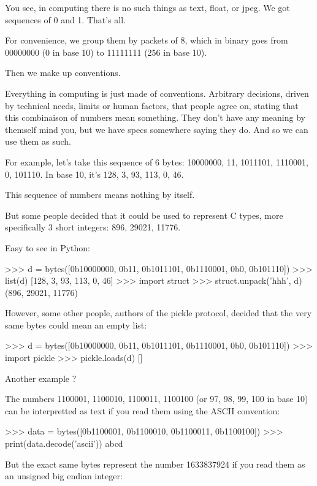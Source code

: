 You see, in computing there is no such things as text, float, or jpeg. We got sequences of 0 and 1. That's all.

For convenience, we group them by packets of 8, which in binary goes from 00000000 (0 in base 10) to 11111111 (256 in base 10).

Then we make up conventions.

Everything in computing is just made of conventions. Arbitrary decisions, driven by technical needs, limits or human factors, that people agree on, stating that this combinaison of numbers mean something. They don't have any meaning by themself mind you, but we have specs somewhere saying they do. And so we can use them as such.

For example, let's take this sequence of 6 bytes: 10000000, 11, 1011101, 1110001, 0, 101110. In base 10, it's 128, 3, 93, 113, 0, 46.

This sequence of numbers means nothing by itself.

But some people decided that it could be used to represent C types, more specifically 3 short integers: 896, 29021, 11776.

Easy to see in Python:

\begin{py2and3}
>>> d = bytes([0b10000000, 0b11, 0b1011101, 0b1110001, 0b0, 0b101110])
>>> list(d)
[128, 3, 93, 113, 0, 46]
>>> import struct
>>> struct.unpack('hhh', d)
(896, 29021, 11776)
\end{py2and3}

However, some other people, authors of the pickle protocol, decided that the very same bytes could mean an empty list:

\begin{py2and3}
>>> d = bytes([0b10000000, 0b11, 0b1011101, 0b1110001, 0b0, 0b101110])
>>> import pickle
>>> pickle.loads(d)
[]
\end{py2and3}

Another example ?

The numbers 1100001, 1100010, 1100011, 1100100 (or 97, 98, 99, 100 in base 10) can be interpretted as text if you read them using the ASCII convention:

\begin{py2and3}
>>> data = bytes([0b1100001, 0b1100010, 0b1100011, 0b1100100])
>>> print(data.decode('ascii'))
abcd
\end{py2and3}

But the exact same bytes represent the number 1633837924 if you read them as an unsigned big endian integer:

